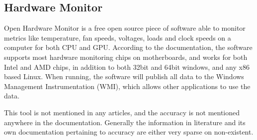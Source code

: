\subsection{Hardware Monitor}

Open Hardware Monitor is a free open source piece of software able to monitor metrics like temperature, fan speeds, voltages, loads and clock speeds on a computer for both CPU and GPU. According to the documentation, the software supports most hardware monitoring chips on motherboards, and works for both Intel and AMD chips, in addition to both 32bit and 64bit windows, and any x86 based Linux. When running, the software will publish all data to the Windows Management Instrumentation (WMI), which allows other applications to use the data.\cite[]{open_hardware_monitor}

This tool is not mentioned in any articles, and the accuracy is not mentioned anywhere in the documentation. Generally the information in literature and its own documentation pertaining to accuracy are either very sparse on non-existent.